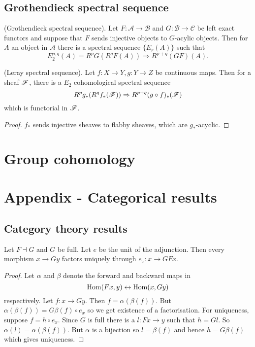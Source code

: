 \documentclass{memoir}
\begin{document}
\section{Grothendieck spectral sequence}
\begin{thm}
    (Grothendieck spectral sequence).
    Let $F:\mathcal A \to \mathcal B$ and $G:\mathcal B \to \mathcal C$ be left exact functors and suppose that $F$ sends injective objects to $G$-acylic objects.
    Then for $A$ an object in $\mathcal A$ there is a spectral sequence $\{E_r(A)\}$ such that 
    \begin{equation}
        E_2^{p,q}(A) = R^pG(R^qF(A)) \Rightarrow R^{p+q}(GF)(A).
    \end{equation}
\end{thm}
\begin{corollary}
    (Leray spectral sequence).
    Let $f:X\to Y, g:Y\to Z$ be continuous maps.
    Then for a sheaf $\mathscr{F}$, there is a $E_2$ cohomological spectral sequence
    \begin{equation}
        R^pg_*(R^qf_*(\mathscr{F})) \Rightarrow R^{p+q}(g\circ f)_*(\mathscr{F})
    \end{equation}
    which is functorial in $\mathscr{F}$.
\end{corollary}
\begin{proof}
    $f_*$ sends injective sheaves to flabby sheaves, which are $g_*$-acyclic.
\end{proof}
\chapter{Group cohomology}

\chapter{Appendix - Categorical results}
\section{Category theory results}
\begin{proposition}
    \label{prop:cat_factor}
    Let $F\dashv G$ and $G$ be full.
    Let $e$ be the unit of the adjunction.
    Then every morphism $x\to Gy$ factors uniquely through $e_x:x\to GFx$.
\end{proposition}
\begin{proof}
    Let $\alpha$ and $\beta$ denote the forward and backward maps in
    \begin{equation}
        \operatorname{Hom}(Fx,y) \leftrightarrow \operatorname{Hom}(x,Gy)
    \end{equation}
    respectively.
    Let $f:x\to Gy$.
    Then $f = \alpha(\beta(f))$.
    But $\alpha(\beta(f)) = G\beta(f)\circ e_x$ so we get existence of a factorisation.
    For uniqueness, suppose $f = h\circ e_x$.
    Since $G$ is full there is a $l:Fx\to y$ such that $h = Gl$.
    So $\alpha(l) = \alpha(\beta(f))$.
    But $\alpha$ is a bijection so $l = \beta(f)$ and hence $h = G\beta(f)$ which gives uniqueness.
\end{proof}
\end{document}
